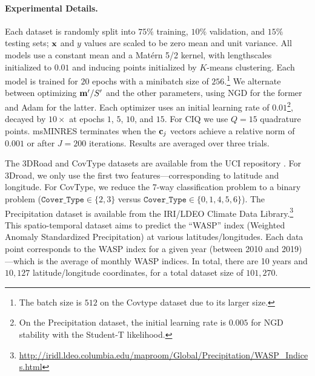 \paragraph{Experimental Details.}
Each dataset is randomly split into $75\%$ training, $10\%$ validation, and $15\%$ testing sets; $\mathbf{x}$ and $y$ values are scaled to be zero mean and unit variance.
All models use a constant mean and a Mat\'ern 5/2 kernel, with lengthscales initialized to $0.01$ and inducing points initialized by $K$-means clustering.
Each model is trained for $20$ epochs with a minibatch size of $256.$\footnote{
  The batch size is $512$ on the Covtype dataset due to its larger size.
}
We alternate between optimizing $\mathbf{m}'/S'$ and the other parameters, using NGD for the former and Adam \cite{kingma2014adam} for the latter.
Each optimizer uses an initial learning rate of $0.01$\footnote{
  On the Precipitation dataset, the initial learning rate is $0.005$ for NGD stability with the Student-T likelihood.
}, decayed by $10\times$ at epochs $1$, $5$, $10$, and $15$.
For CIQ we use $Q = 15$ quadrature points.
msMINRES terminates when the $\mathbf{c}_j$ vectors achieve a relative norm of $0.001$ or after $J=200$ iterations.
Results are averaged over three trials.

The 3DRoad and CovType datasets are available from the UCI repository \citep{asuncion2007uci}.
For 3Droad, we only use the first two features---corresponding to latitude and longitude.
For CovType, we reduce the 7-way classification problem to a binary problem ($\mathtt{Cover\_Type} \in \{ 2, 3\}$ versus $\mathtt{Cover\_Type} \in \{ 0, 1, 4, 5, 6 \}$).
The Precipitation dataset is available from the IRI/LDEO Climate Data Library.\footnote{
  \url{http://iridl.ldeo.columbia.edu/maproom/Global/Precipitation/WASP_Indices.html}
}
This spatio-temporal dataset aims to predict the ``WASP'' index (Weighted Anomaly Standardized Precipitation) at various latitudes/longitudes.
Each data point corresponds to the WASP index for a given year (between 2010 and 2019)---which is the average of monthly WASP indices.
In total, there are 10 years and $10,\!127$ latitude/longitude coordinates, for a total dataset size of $101,\!270$.

